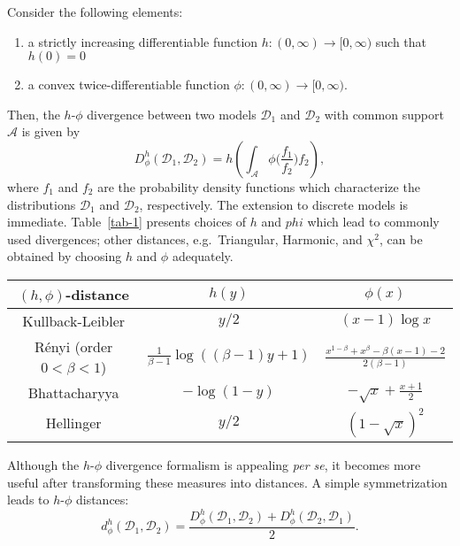 \documentclass[12pt]{article}
\begin{document}
Consider the following elements:
\begin{enumerate}[label=\textbf{(E\arabic*)},itemsep=5pt]
	\item\label{E1} a strictly increasing differentiable function $h\colon(0,\infty)\to[0,\infty)$ such that $h(0)=0$
	\item\label{E2} a convex twice-differentiable function $\phi\colon(0,\infty)\to[0,\infty)$.
\end{enumerate}
Then, the $h$-$\phi$ divergence between two models $\mathcal D_1$ and $\mathcal D_2$ with common support $\mathcal A$ is given by
\begin{equation}
D^h_\phi(\mathcal D_1,\mathcal D_2) = 
h\left(
\int_{\mathcal A} \phi\Big(
\frac{f_1}{f_2} 
\Big)
f_2
\right),
\label{eq:DhphiGeneral}
\end{equation}
where $f_1$ and $f_2$ are the probability density functions which characterize the distributions $\mathcal D_1$ and $\mathcal D_2$, respectively.
The extension to discrete models is immediate.
Table~\ref{tab-1} presents choices of $h$ and $phi$ which lead to commonly used divergences;
other distances, e.g.\ Triangular, Harmonic, and $\chi^2$, can be obtained by choosing $h$ and $\phi$ adequately.

\begin{table*}[hbt]
	\centering   
	\caption{($h,\phi$)-divergences and their functions}
	\begin{tabular}{ccc}
		\toprule
		{ $(h,\phi)$-{distance}} & { $h(y)$} & { $\phi(x)$} \\
		\midrule
		Kullback-Leibler & ${y}/{2}$ & $(x-1)\log x$  \\
		R\'{e}nyi (order $0<\beta<1$) & $\frac{1}{\beta-1}\log((\beta-1)y+1)$ & 
		$\frac{x^{1-\beta}+x^{\beta}-\beta(x-1)-2}{2(\beta-1)}$\\
		Bhattacharyya  & $-\log(1-y)$ & $-\sqrt{x}+\frac{x+1}{2}$ \\
		Hellinger  & ${y}/{2}$ &  $(1-\sqrt{x})^2$  \\ \bottomrule
	\end{tabular}
	\label{tab-1}
\end{table*}

Although the $h$-$\phi$ divergence formalism is appealing \textit{per se}, it becomes more useful after transforming these measures into distances.
A simple symmetrization leads to $h$-$\phi$ distances:
\begin{equation}
d^h_\phi(\mathcal D_1,\mathcal D_2) = \frac{D^h_\phi(\mathcal D_1,\mathcal D_2) + D^h_\phi(\mathcal D_2,\mathcal D_1)}{2}.
\label{eq:DistanceFromDivergence}
\end{equation}
\end{document}

